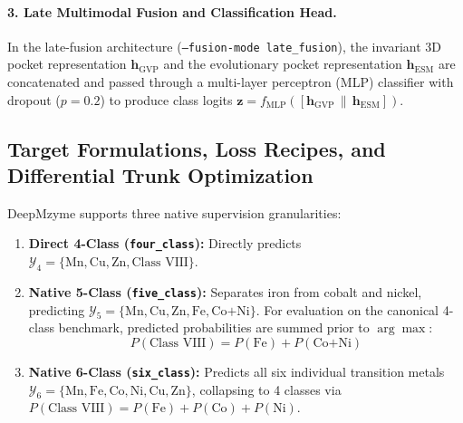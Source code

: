 \documentclass[10pt,a4paper,twocolumn]{article}
\begin{document}
\paragraph{3. Late Multimodal Fusion and Classification Head.}
In the late-fusion architecture (\texttt{--fusion-mode late\_fusion}), the invariant 3D pocket representation $\mathbf{h}_{\text{GVP}}$ and the evolutionary pocket representation $\mathbf{h}_{\text{ESM}}$ are concatenated and passed through a multi-layer perceptron (MLP) classifier with dropout ($p = 0.2$) to produce class logits $\mathbf{z} = f_{\text{MLP}}([\mathbf{h}_{\text{GVP}} \,\|\, \mathbf{h}_{\text{ESM}}])$.

\subsection{Target Formulations, Loss Recipes, and Differential Trunk Optimization}

DeepMzyme supports three native supervision granularities:
\begin{enumerate}
  \item \textbf{Direct 4-Class (\texttt{four\_class}):} Directly predicts $\mathcal{Y}_4 = \{\text{Mn}, \text{Cu}, \text{Zn}, \text{Class VIII}\}$.
  \item \textbf{Native 5-Class (\texttt{five\_class}):} Separates iron from cobalt and nickel, predicting $\mathcal{Y}_5 = \{\text{Mn}, \text{Cu}, \text{Zn}, \text{Fe}, \text{Co+Ni}\}$. For evaluation on the canonical 4-class benchmark, predicted probabilities are summed prior to $\arg\max$:
  \begin{equation}
    P(\text{Class VIII}) = P(\text{Fe}) + P(\text{Co+Ni})
  \end{equation}
  \item \textbf{Native 6-Class (\texttt{six\_class}):} Predicts all six individual transition metals $\mathcal{Y}_6 = \{\text{Mn}, \text{Fe}, \text{Co}, \text{Ni}, \text{Cu}, \text{Zn}\}$, collapsing to 4 classes via $P(\text{Class VIII}) = P(\text{Fe}) + P(\text{Co}) + P(\text{Ni})$.
\end{enumerate}
\end{document}
